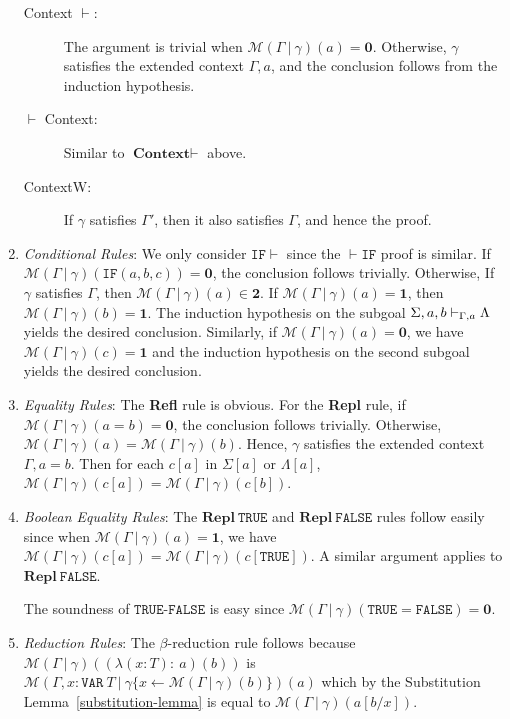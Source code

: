 \documentclass [12pt,twoside]{cslreport}
\newcommand{\thmbox}
   {{\ \hfill\hbox{%
      \vrule width1.0ex height1.0ex
   }\parfillskip 0pt }}
\newenvironment{proof}{{\bf Proof. }}{\thmbox}
\newcommand{\Mgamma}[1]{{\mathcal M}(\Gamma\vbar\gamma)(#1)}
\newcommand{\twob}{\mathbf{2}}
\newcommand{\oneb}{\mathbf{1}}
\newcommand{\zerob}{\mathbf{0}}
\newcommand{\tttrue}{\mathtt{TRUE}}
\newcommand{\ttfalse}{\mathtt{FALSE}}
\newcommand{\ttvar}{\mathtt{VAR}}
\newcommand{\vbar}{\ |\ }
\begin{document}
\begin{proof}
\begin{enumerate}
\begin{description}
\item [Context $\vdash$: ] The argument is trivial when $\Mgamma{a} =
\zerob$.  Otherwise, $\gamma$ satisfies the extended context $\Gamma, a$,
and the conclusion follows from the induction hypothesis.

\item [$\vdash$ Context: ] Similar to $\textbf{Context} \vdash$ above.

\item [ContextW: ]  If $\gamma$ satisfies $\Gamma'$, then it also
satisfies $\Gamma$, and hence the proof.
\end{description}

\item \emph{Conditional Rules}: We only consider $ \mathtt{IF} \vdash$
since the $\vdash \mathtt{IF}$ proof is similar.  If $\Mgamma{
\mathtt{IF}(a, b, c)} = \zerob$, the conclusion follows  trivially.
Otherwise, If $\gamma$ satisfies
$\Gamma$, then $\Mgamma{a}\in \twob$.  If $\Mgamma{a} = \oneb$, then
$\Mgamma{b} = \oneb$.  The induction hypothesis on the subgoal
$\Sigma, a, b\vdash_{\Gamma, a}\Lambda$ yields the desired
conclusion.  Similarly, if $\Mgamma{a} = \zerob$, we have $\Mgamma{c} =
\oneb$
and the induction hypothesis on the second subgoal yields the
desired conclusion.

\item \emph{Equality Rules}: The \textbf{Refl} rule is obvious. 
For the \textbf{Repl} rule, if $\Mgamma{a = b} = \zerob$, the conclusion
follows trivially.  Otherwise, $\Mgamma{a} = \Mgamma{b}$.  Hence, $\gamma$
satisfies the extended context $\Gamma, a = b$.  Then for each
$c[a]$ in $\Sigma[a]$ or $\Lambda[a]$, $\Mgamma{c[a]} = \Mgamma{c[b]}$\@.
\begin{comment}
Note: no free variables in a, b.  Need to show that
replacement preserves meaning when there is no capture.
\end{comment}

\item \emph{Boolean Equality Rules}: The $\mathbf{Repl}~\tttrue$ and
$\mathbf{Repl}~\ttfalse$ rules follow easily since when $\Mgamma{a} =
\oneb$, we have $\Mgamma{c[a]} = \Mgamma{c[\tttrue]}$\@.
A similar argument applies to $\mathbf{Repl}~\ttfalse$\@.

The soundness of $\tttrue\mbox{-}\ttfalse$ is easy since
$\Mgamma{\tttrue = \ttfalse} = \zerob$\@.

\item \emph{Reduction Rules}:  The $\beta$-reduction rule follows because
$\Mgamma{(\lambda (x : T):~a)(b)}$ is
$\mathcal{M}(\Gamma, x : \ttvar~T\vbar \gamma\{x\gets\Mgamma{b}\})(a)$
which by the Substitution Lemma~\ref{substitution-lemma} is
equal to $\Mgamma{a[b/x]}$\@.


\end{enumerate}
\end{proof}
\end{document}
